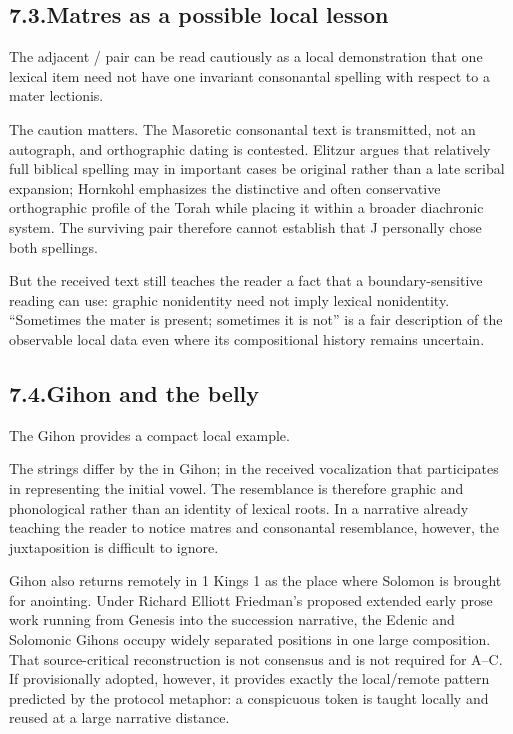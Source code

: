 \subsection*{7.3.\quad Matres as a possible local lesson}

The adjacent / pair can be read cautiously as a local demonstration that one lexical item need not have one invariant consonantal spelling with respect to a mater lectionis.

The caution matters.  The Masoretic consonantal text is transmitted, not an autograph, and orthographic dating is contested.  Elitzur argues that relatively full biblical spelling may in important cases be original rather than a late scribal expansion; Hornkohl emphasizes the distinctive and often conservative orthographic profile of the Torah while placing it within a broader diachronic system.\cite{Elitzur2023,Hornkohl2024}  The surviving pair therefore cannot establish that J personally chose both spellings.

But the received text still teaches the reader a fact that a boundary-sensitive reading can use: graphic nonidentity need not imply lexical nonidentity.  ``Sometimes the mater is present; sometimes it is not'' is a fair description of the observable local data even where its compositional history remains uncertain.

\subsection*{7.4.\quad Gihon and the belly}

The Gihon provides a compact local example.


The strings differ by the  in Gihon; in the received vocalization that  participates in representing the initial vowel.  The resemblance is therefore graphic and phonological rather than an identity of lexical roots.  In a narrative already teaching the reader to notice matres and consonantal resemblance, however, the juxtaposition is difficult to ignore.

Gihon also returns remotely in 1 Kings 1 as the place where Solomon is brought for anointing.  Under Richard Elliott Friedman's proposed extended early prose work running from Genesis into the succession narrative, the Edenic and Solomonic Gihons occupy widely separated positions in one large composition.\cite{Friedman1998}  That source-critical reconstruction is not consensus and is not required for A--C.  If provisionally adopted, however, it provides exactly the local/remote pattern predicted by the protocol metaphor: a conspicuous token is taught locally and reused at a large narrative distance.

